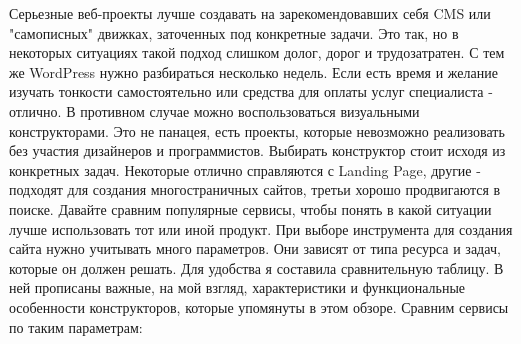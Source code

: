 Серьезные веб-проекты лучше создавать на зарекомендовавших себя CMS или "самописных" движках, заточенных под конкретные задачи. Это так, но в некоторых ситуациях такой подход слишком долог, дорог и трудозатратен. С тем же WordPress нужно разбираться несколько недель. Если есть время и желание изучать тонкости самостоятельно или средства для оплаты услуг специалиста - отлично. В противном случае можно воспользоваться визуальными конструкторами. Это не панацея, есть проекты, которые невозможно реализовать без участия дизайнеров и программистов.
Выбирать конструктор стоит исходя из конкретных задач. Некоторые отлично справляются с Landing Page, другие - подходят для создания многостраничных сайтов, третьи хорошо продвигаются в поиске. Давайте сравним популярные сервисы, чтобы понять в какой ситуации лучше использовать тот или иной продукт.
При выборе инструмента для создания сайта нужно учитывать много параметров. Они зависят от типа ресурса и задач, которые он должен решать. Для удобства я составила сравнительную таблицу. В ней прописаны важные, на мой взгляд, характеристики и функциональные особенности конструкторов, которые упомянуты в этом обзоре.
Сравним сервисы по таким параметрам:


